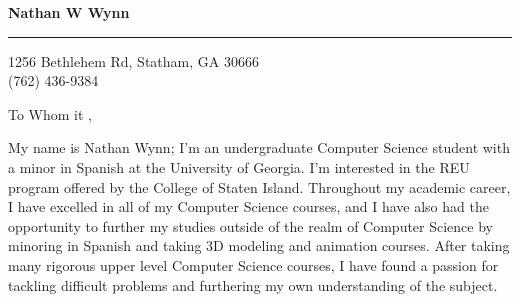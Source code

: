 \documentclass{letter} %
\begin{document}
\signature{Nathan W Wynn}           %
\longindentation=0pt                       %
\let\raggedleft\raggedright                %
 
 


\begin{flushleft}
{\large\bf Nathan W Wynn}
\end{flushleft}
\medskip\hrule height 1pt
\begin{flushright}
\hfill 1256 Bethlehem Rd, Statham, GA 30666 \\
\hfill (762) 436-9384
\end{flushright} 
\vfill %

 
\opening{To Whom it ,} 
\noindent My name is Nathan Wynn; I'm an undergraduate Computer Science student with a minor in Spanish at the University of Georgia. I'm interested in the REU program offered by the College of Staten Island. Throughout my academic career, I have excelled in all of my Computer Science courses, and I have also had the opportunity to further my studies outside of the realm of Computer Science by minoring in Spanish and taking 3D modeling and animation courses. After taking many rigorous upper level Computer Science courses, I have found a passion for tackling difficult problems and furthering my own understanding of the subject.
\end{document}
